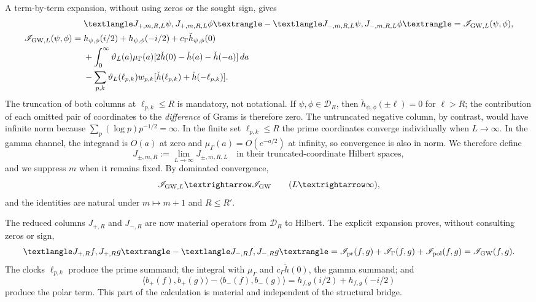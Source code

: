 A term-by-term expansion, without using zeros or the sought sign, gives
\begin{align*}
 &\langle J_{+,m,R,L}\psi,J_{+,m,R,L}\phi\rangle
 -\langle J_{-,m,R,L}\psi,J_{-,m,R,L}\phi\rangle
 =\mathscr I_{{\rm GW},L}(\psi,\phi),\\
 \mathscr I_{{\rm GW},L}(\psi,\phi)
 ={}&h_{\psi,\phi}(i/2)+h_{\psi,\phi}(-i/2)
 +c_\Gamma\check h_{\psi,\phi}(0)\\
 &+\int_0^\infty\vartheta_L(a)\mu_\Gamma(a)
 [2\check h(0)-\check h(a)-\check h(-a)]\,da\\
 &-\sum_{p,k}\vartheta_L(\ell_{p,k})w_{p,k}
 [\check h(\ell_{p,k})+\check h(-\ell_{p,k})].
\end{align*}
The truncation of both columns at \(\ell_{p,k}\leq R\) is mandatory, not
notational. If \(\psi,\phi\in\mathcal D_R\), then
\(\check h_{\psi,\phi}(\pm\ell)=0\) for \(\ell>R\); the contribution of each
omitted pair of coordinates to the \emph{difference} of Grams is therefore zero.
The untruncated negative column, by contrast, would have infinite norm because
\(\sum_p(\log p)p^{-1/2}=\infty\). In the finite set
\(\ell_{p,k}\leq R\) the prime coordinates converge individually when
\(L\to\infty\). In the gamma channel, the integrand is \(O(a)\) at zero and
\(\mu_\Gamma(a)=O(e^{-a/2})\) at infinity, so convergence is also
in norm. We therefore define
\begin{equation}\label{eq:pdf2-rh-columnas-reducidas}
 J_{\pm,m,R}:=\lim_{L\to\infty}J_{\pm,m,R,L}
 \quad\text{in their truncated-coordinate Hilbert spaces},
\end{equation}
and we suppress \(m\) when it remains fixed. By dominated convergence,
\[
 \mathscr I_{{\rm GW},L}\longrightarrow\mathscr I_{\rm GW}
 \qquad(L\to\infty),
\]
and the identities are natural under $m\mapsto m+1$ and $R\le R'$.

The reduced columns \(J_{+,R}\) and \(J_{-,R}\) are now material
operators from \(\mathcal D_R\) to Hilbert. The explicit expansion proves, without
consulting zeros or sign,
\begin{equation}\label{eq:pdf2-rh-gram-difference-gw}
 \langle J_{+,R}f,J_{+,R}g\rangle
 -\langle J_{-,R}f,J_{-,R}g\rangle
 =\mathscr I_{\rm pr}(f,g)+\mathscr I_\Gamma(f,g)
  +\mathscr I_{\rm pol}(f,g)
 =\mathscr I_{\rm GW}(f,g).
\end{equation}
The clocks \(\ell_{p,k}\) produce the prime summand; the integral with
\(\mu_\Gamma\) and \(c_\Gamma\check h(0)\), the gamma summand; and
\[
 \langle b_+(f),b_+(g)\rangle-
 \langle b_-(f),b_-(g)\rangle
 =h_{f,g}(i/2)+h_{f,g}(-i/2)
\]
produce the polar term. This part of the calculation is material and independent
of the structural bridge.

